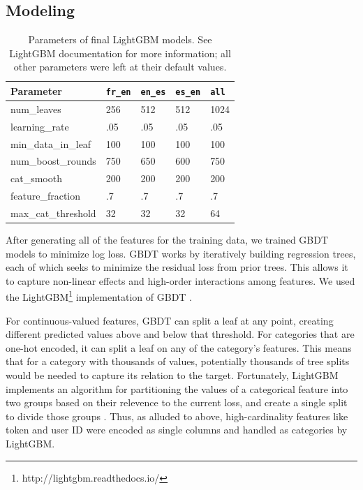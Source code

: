 \documentclass[11pt,a4paper]{article}
\begin{document}
\subsection{Modeling}

\begin{table}[t!]
\small
\begin{center}
\begin{tabular}{|l|llll|}
  \hline \bf Parameter & {\tt fr\_en} & {\tt en\_es} & {\tt es\_en} & {\tt all} \\ \hline
  num\_leaves & 256 & 512 & 512 & 1024 \\
  learning\_rate & .05 & .05 & .05 & .05 \\
  min\_data\_in\_leaf & 100 & 100 & 100 & 100 \\
  num\_boost\_rounds & 750 & 650 & 600 & 750 \\
  cat\_smooth & 200 & 200 & 200& 200 \\
  feature\_fraction & .7 & .7 & .7 & .7 \\
  max\_cat\_threshold & 32 & 32 & 32& 64 \\
\hline
\end{tabular}
\end{center}
\caption{\label{lightgbm-params} Parameters of final LightGBM models. See
  LightGBM documentation for more information; all other parameters were left at
their default values.}
\end{table}

After generating all of the features for the training data, we trained GBDT models to minimize log loss. GBDT works by
iteratively building regression trees, each of which seeks to minimize the
residual loss from prior trees. This allows it to capture non-linear effects
and high-order interactions among features. We used the LightGBM\footnote{http://lightgbm.readthedocs.io/} implementation
of GBDT \cite{ke2017lightgbm}.

For continuous-valued features, GBDT can split a leaf at any point, creating
different predicted values above and below that threshold. For categories that
are one-hot encoded, it can split a leaf on any of the category's features. This
means that for a category with thousands of values, potentially thousands of
tree splits would be needed to capture its relation to the target. Fortunately,
LightGBM implements an algorithm for partitioning the values of a categorical
feature into two groups based on their relevence to the current loss, and create
a single split to divide those groups \cite{fisher1958grouping}. Thus, as
alluded to above, high-cardinality features like token and user ID were encoded as
single columns and handled as categories by LightGBM.
\end{document}
